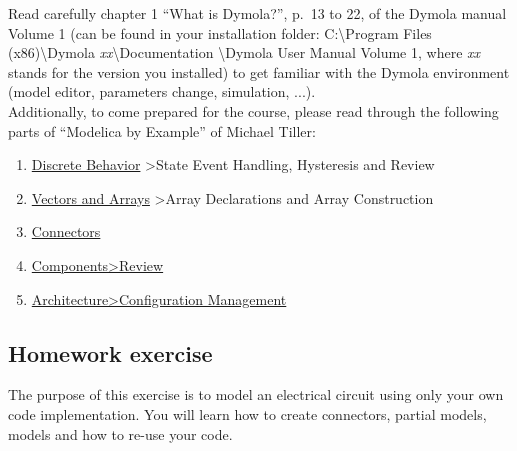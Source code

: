 \documentclass[10pt,a4paper]{article}
\begin{document}
Read carefully chapter 1 ``What is Dymola?'', p.~13 to 22, of the Dymola manual Volume 1 (can be found in your installation folder: C:\textbackslash Program Files (x86)\textbackslash Dymola \textit{xx}\textbackslash Documentation \textbackslash Dymola User Manual Volume 1, where \textit{xx} stands for the version you installed) to get familiar with the Dymola environment (model editor, parameters change, simulation, ...).\\

Additionally, to come prepared for the course, please read through the following parts of ``Modelica by Example'' of Michael Tiller: 
\begin{enumerate}
\item \href{http://book.xogeny.com/behavior/discrete/}{Discrete Behavior} >State Event Handling, Hysteresis and Review
\item	\href{http://book.xogeny.com/behavior/arrays/}{Vectors and Arrays} >Array Declarations and Array Construction
\item	\href{http://book.xogeny.com/components/connectors/}{Connectors}
\item	\href{http://book.xogeny.com/components/components/#review}{Components>Review}
\item \href{http://book.xogeny.com/components/architectures/replaceable/}{Architecture>Configuration Management}
		
\end{enumerate}

\subsection*{Homework exercise}
The purpose of this exercise is to model an electrical circuit using only your own code implementation. You will learn how to create connectors, partial models, models and how to re-use your code.
\end{document}
